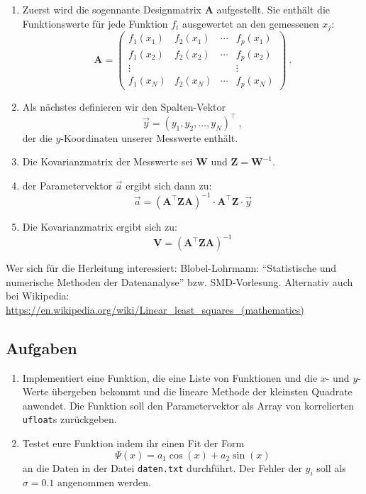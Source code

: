 \documentclass{scrartcl}
\begin{document}
\begin{enumerate}
  \item Zuerst wird die sogennante Designmatrix $\symbf{A}$ aufgestellt.
    Sie enthält die Funktionswerte für jede Funktion $f_i$ ausgewertet an den gemessenen $x_j$:
    \begin{equation}
      \symbf{A} =
      \begin{pmatrix}
        f_1(x_1) & f_2(x_1) & \cdots & f_p(x_1) \\
        f_1(x_2) & f_2(x_2) & \cdots & f_p(x_2) \\
        \vdots   &          &        &  \vdots  \\
        f_1(x_N) & f_2(x_N) & \cdots & f_p(x_N)
      \end{pmatrix} \ .
    \end{equation}
  \item Als nächstes definieren wir den Spalten-Vektor
    \begin{equation}
      \vec{y} = (y_1, y_2, …, y_N)^{\top} \ ,
    \end{equation}
    der die $y$-Koordinaten unserer Messwerte enthält.
  \item Die Kovarianzmatrix der Messwerte sei $\symbf{W}$ und $\symbf{Z} = \symbf{W}^{-1}$.
  \item der Parametervektor $\vec{a}$ ergibt sich dann zu:
    \begin{equation}
      \vec{a} = \left(\symbf{A}^\top \symbf{Z} \symbf{A}\right)^{-1} \cdot \symbf{A}^\top \symbf{Z} \cdot \vec{y}
    \end{equation}
  \item Die Kovarianzmatrix ergibt sich zu:
    \begin{equation}
      \symbf{V} = \left(\symbf{A}^\top \symbf{Z} \symbf{A}\right)^{-1}
    \end{equation}
\end{enumerate}
Wer sich für die Herleitung interessiert: Blobel-Lohrmann: \enquote{Statistische und numerische Methoden der Datenanalyse} bzw. SMD-Vorlesung.
Alternativ auch bei Wikipedia: \url{https://en.wikipedia.org/wiki/Linear_least_squares_(mathematics)}

\subsection*{Aufgaben}

\begin{enumerate}
  \item Implementiert eine Funktion, die eine Liste von Funktionen und die $x$- und $y$-Werte übergeben bekommt und die lineare Methode der kleinsten Quadrate anwendet.
    Die Funktion soll den Parametervektor als Array von korrelierten \texttt{ufloat}s zurückgeben.
  \item Testet eure Funktion indem ihr einen Fit der Form
    \begin{equation}
      \Psi(x) = a_1 \cos(x) + a_2 \sin(x)
    \end{equation}
    an die Daten in der Datei \texttt{daten.txt} durchführt.
    Der Fehler der $y_i$ soll als $\sigma = \num{0.1}$ angenommen werden.
\end{enumerate}
\end{document}
